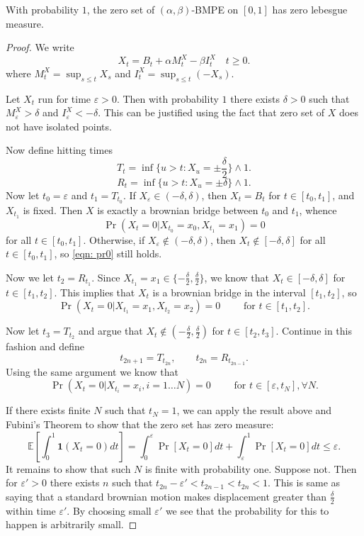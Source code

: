\begin{proposition}
	With probability $1$, the zero set of $\left( \alpha, \beta \right) $-BMPE on $[0,1]$ has zero lebesgue measure.
\end{proposition}
\begin{proof}
	We write
	\[
		X_t=B_t+\alpha M_t^X-\beta I_t^X \quad t \geqslant 0
	.\] 
	where $M_t^X=\sup _{s \leqslant t} X_s$ and $I_t^X=\sup _{s \leqslant t}\left(-X_s\right)$. 

	Let  $X_t$ run for time  $\varepsilon>0$. Then with probability $1$ there exists $\delta>0$ such that $M_\varepsilon^X > \delta$ and $I_\varepsilon^X < - \delta$. This can be justified using the fact that zero set of $X$ does not have isolated points. 

	Now define hitting times
	\[
		T_t = \inf\{u>t: X_u = \pm \frac{\delta}{2} \} \wedge 1
	.\]
	\[
		R_t = \inf \{u>t: X_u = \pm \delta\} \wedge 1
	.\] 
	Now let $t_0 = \varepsilon $ and $t_1 = T_{t_0}$. If $X_\varepsilon \in \left( - \delta, \delta \right) $, then $X_t = B_t$ for $t \in [t_0, t_1]$, and $X_{t_1}$ is fixed. Then $X$ is exactly a brownian bridge between $t_0$ and $t_1$, whence
	\begin{equation}\label{eqn: pr0}
		\operatorname{Pr} (X_t=0 | X_{t_0} = x_0, X_{t_1} = x_1) =0
	\end{equation}
	for all $t \in [t_0, t_1]$. Otherwise, if $X_\varepsilon \not\in \left( -\delta, \delta \right) $, then $X_t \not\in [-\delta, \delta]$ for all $t \in [t_0,t_1]$, so \eqref{eqn: pr0} still holds.

	Now we let $t_2 = R_{t_1}$. Since $X_{t_1} = x_1 \in \{-\frac{\delta}{2}, \frac{\delta}{2}\} $, we know that $X_{t} \in \left[ -\delta, \delta \right] $ for $t \in [t_1, t_2]$. This implies that $X_t$ is a brownian bridge in the interval $[t_1, t_2]$, so 
	\[
		\operatorname{Pr} (X_t = 0|X_{t_1} = x_1, X_{t_2} = x_2) = 0 \qquad \text{ for }t \in [t_1,t_2]
	.\] 

	Now let $t_3 = T_{t_2}$ and argue that $X_t \not\in (-\frac{\delta}{2}, \frac{\delta}{2})$ for $t \in [t_2, t_3]$. Continue in this fashion and define
	\[
		t_{2n+1} = T_{t_{2n}}, \qquad t_{2n} = R_{t_{2n-1}}
	.\] 
	Using the same argument we know that 
	 \[
		 \operatorname{Pr} (X_t = 0|X_{t_i} = x_i, i = 1\ldots N) = 0 \qquad \text{ for } t \in [\varepsilon, t_N], \forall N
	.\] 
	
	If there exists finite $N$ such that $t_N = 1$, we can apply the result above and Fubini's Theorem to show that the zero set has zero measure:
	\[
		\mathbb{E}\left[ \int _0^1 \mathbf{1}(X_t = 0) dt \right] = \int _0^\varepsilon \operatorname{Pr} \left[ X_t = 0 \right] dt + \int _\varepsilon^1 \operatorname{Pr} \left[ X_t = 0 \right] dt \le \varepsilon 
	.\] 
	It remains to show that such $N$ is finite with probability one. Suppose not. Then for  $\varepsilon'>0$ there exists $n$ such that $t_{2n}- \varepsilon' < t_{2n-1} < t_{2n} < 1 $. This is same as saying that a standard brownian motion makes displacement greater than $\frac{\delta}{2}$ within time $\varepsilon'$. By choosing small $\varepsilon'$ we see that the probability for this to happen is arbitrarily small.
\end{proof}

